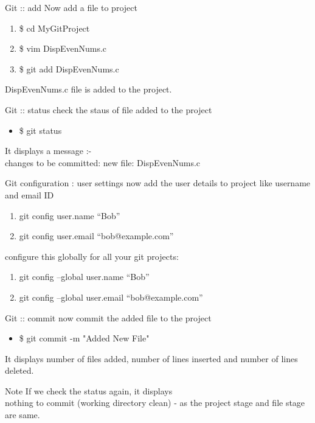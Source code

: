 \documentclass[14pt]{beamer}
\begin{document}
\begin{frame}{Git :: add}
Now add a file to project
\begin{enumerate}
\item \$ cd MyGitProject
\item \$ vim DispEvenNums.c
\item \$ git add DispEvenNums.c
\end{enumerate}
\begin{block}{}
DispEvenNums.c file is added to the project.
\end{block}
\end{frame}

\begin{frame}{Git :: status}
check the staus of file added to the project
\begin{itemize}
\item \$ git status
\end{itemize}
\begin{block}{}
It displays a message :-\\  changes to be committed:  new file: DispEvenNums.c 
\end{block}
\end{frame}

\begin{frame}{Git configuration : user settings}
now add the user details to project like username and email ID
\begin{enumerate}
\item git config user.name ``Bob''
\item git config user.email ``bob@example.com''
\end{enumerate}
configure this globally for all your git projects:
\begin{enumerate}
\item git config --global user.name ``Bob''
\item git config --global user.email ``bob@example.com''
\end{enumerate}
\end{frame}

\begin{frame}{Git :: commit}
now commit the added file to the project
\begin{itemize}
\item \$ git commit -m "Added New File"
\end{itemize}
\begin{block}{}
It displays number of files added, number of lines inserted and number of lines deleted.
\end{block}
\begin{block}{Note }
If we check the status again, it displays\\ nothing to commit (working directory clean) - as the project stage and file stage are same.
\end{block}
\end{frame}
\end{document}
